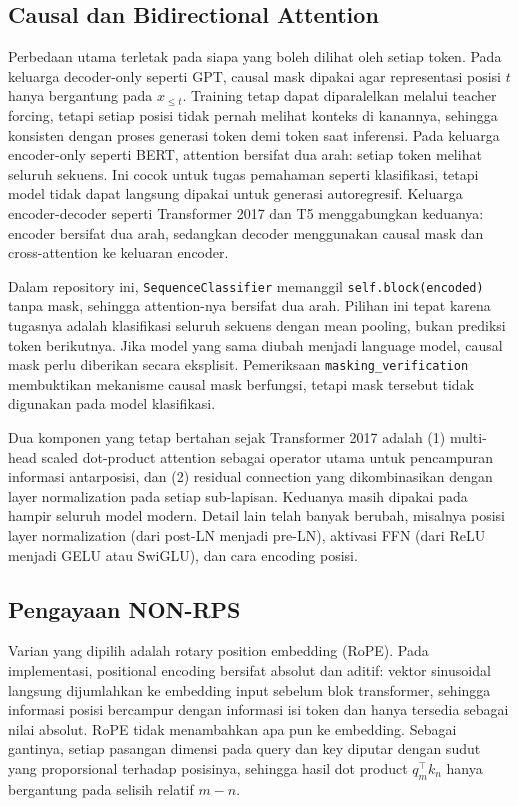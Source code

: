 \documentclass[12pt,a4paper]{article}
\newcommand{\code}[1]{\texttt{\small #1}}
\begin{document}
\subsection{Causal dan Bidirectional Attention}
Perbedaan utama terletak pada siapa yang boleh dilihat oleh setiap token. Pada keluarga decoder-only seperti GPT, causal mask dipakai agar representasi posisi $t$ hanya bergantung pada $x_{\le t}$. Training tetap dapat diparalelkan melalui teacher forcing, tetapi setiap posisi tidak pernah melihat konteks di kanannya, sehingga konsisten dengan proses generasi token demi token saat inferensi. Pada keluarga encoder-only seperti BERT, attention bersifat dua arah: setiap token melihat seluruh sekuens. Ini cocok untuk tugas pemahaman seperti klasifikasi, tetapi model tidak dapat langsung dipakai untuk generasi autoregresif. Keluarga encoder-decoder seperti Transformer 2017 dan T5 menggabungkan keduanya: encoder bersifat dua arah, sedangkan decoder menggunakan causal mask dan cross-attention ke keluaran encoder.

Dalam repository ini, \code{SequenceClassifier} memanggil \code{self.block(encoded)} tanpa mask, sehingga attention-nya bersifat dua arah. Pilihan ini tepat karena tugasnya adalah klasifikasi seluruh sekuens dengan mean pooling, bukan prediksi token berikutnya. Jika model yang sama diubah menjadi language model, causal mask perlu diberikan secara eksplisit. Pemeriksaan \code{masking\_verification} membuktikan mekanisme causal mask berfungsi, tetapi mask tersebut tidak digunakan pada model klasifikasi.

Dua komponen yang tetap bertahan sejak Transformer 2017 adalah (1) multi-head scaled dot-product attention sebagai operator utama untuk pencampuran informasi antarposisi, dan (2) residual connection yang dikombinasikan dengan layer normalization pada setiap sub-lapisan. Keduanya masih dipakai pada hampir seluruh model modern. Detail lain telah banyak berubah, misalnya posisi layer normalization (dari post-LN menjadi pre-LN), aktivasi FFN (dari ReLU menjadi GELU atau SwiGLU), dan cara encoding posisi.

\subsection{Pengayaan NON-RPS}
Varian yang dipilih adalah rotary position embedding (RoPE). Pada implementasi, positional encoding bersifat absolut dan aditif: vektor sinusoidal langsung dijumlahkan ke embedding input sebelum blok transformer, sehingga informasi posisi bercampur dengan informasi isi token dan hanya tersedia sebagai nilai absolut. RoPE tidak menambahkan apa pun ke embedding. Sebagai gantinya, setiap pasangan dimensi pada query dan key diputar dengan sudut yang proporsional terhadap posisinya, sehingga hasil dot product $q_m^\top k_n$ hanya bergantung pada selisih relatif $m-n$.
\end{document}
